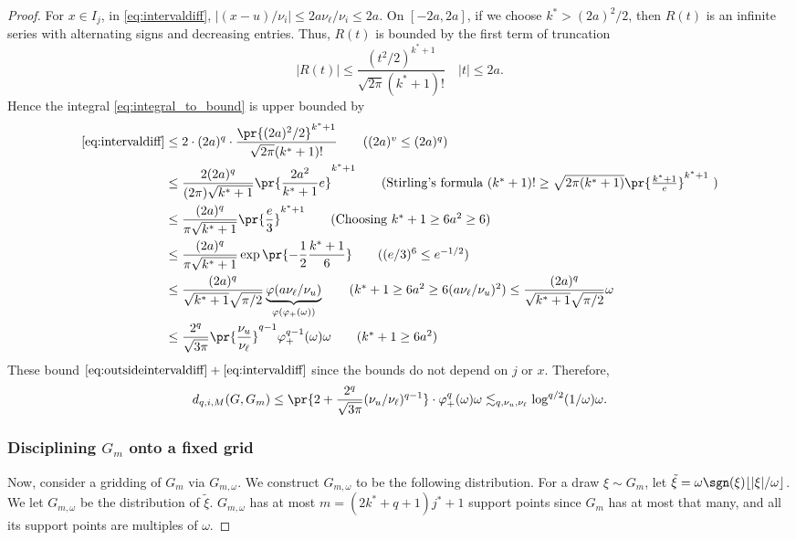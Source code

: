 \documentclass[12pt, reqno]{amsart}
\newcommand{\invphi}{\varphi_{+}}
\numberwithin{equation}{section}
\begin{document}
\begin{refsection}
\begin{appendices}
\begin{proof}
For $x \in I_j$, in \eqref{eq:intervaldiff}, $|(x-u)/\nu_i| \le 2a\nu_\ell / \nu_i \le
2a$. On $[-2a, 2a]$, if we choose $k^* > (2a)^2/2$, then $R(t)$ is an infinite series with
alternating signs and decreasing entries. Thus, $R(t)$
is bounded by the first term of truncation\[
|R(t)| \le \frac{(t^2/2)^{k^* + 1}}{\sqrt{2\pi} (k^* + 1)!} \quad |t| \le 2a. 
\]
Hence the integral
\eqref{eq:integral_to_bound} is upper bounded by \begin{align*}
\eqref{eq:intervaldiff} &
\le 2 \cdot (2a)^q \cdot \frac{ \pr{(2a)^2/2}^{k^*+1}}{
\sqrt{2\pi} (k^*+1)!} \tag{$(2a)^v \le (2a)^q$} \\
&\le
\frac{2(2a)^q}{(2\pi) \sqrt{k^*+1}}\pr{\frac{2a^2}{k^*+1} e}^{k^*+1}  \tag{Stirling's formula $
(k^*+1)! \ge \sqrt{2\pi( k^*+1)} \pr{\frac{k^*+1}{e}}^{k^*+1}
$
} \\&
\le \frac{(2a)^q}{
\pi \sqrt{k^*+1}}\pr{\frac{e}{3}}^{k^*+1} \tag{Choosing $k^*+1 \ge 6a^2 \ge 6$}
\\
& \le \frac{(2a)^q}{
\pi \sqrt{k^*+1}} \exp\pr{-\frac{1}{2} \frac{k^*+1}{6}} \tag{$(e/3)^6 \le
e^{-1/2}$} \\
& \le \frac{(2a)^q}{\sqrt{k^*+1} \sqrt{\pi/2}} \underbrace{\varphi(a\nu_\ell/\nu_u) }_
{\varphi(\varphi_+(\omega))}
\tag{$k^*+1 \ge
6a^2 \ge 6(a\nu_\ell/\nu_u)^2$} \le \frac{(2a)^q}{\sqrt{k^* + 1} \sqrt{\pi/2}} \omega \\
&\le \frac{2^q}{\sqrt{3\pi}}\pr{\frac{\nu_u}{\nu_\ell}}^{q-1} \invphi^{q-1}(\omega) \omega
\tag{$k^* + 1 \ge 6a^2$}
\end{align*}
These bound $\eqref{eq:outsideintervaldiff} + \eqref{eq:intervaldiff}$ since the bounds
do not depend on $j$ or $x$. Therefore, \[ d_{q,i,M}(G,G_m) \le \pr {2 + \frac{2^q}{
\sqrt{3\pi}} (\nu_u/\nu_\ell)^{q-1}} \cdot \invphi^q
 (\omega) \omega \lesssim_{q, \nu_u, \nu_\ell} \log^{q/2}(1/\omega)
\omega.
\]



\subsubsection{Disciplining $G_m$ onto a fixed grid}
Now, consider a gridding of $G_m$ via $G_{m,\omega}$. We construct $G_{m, \omega}$ to be the
following distribution. For a draw $\xi \sim G_m$, let $\tilde \xi = \omega \sgn
(\xi)\lfloor |\xi|/\omega\rfloor$. We let $G_{m,\omega}$ be the distribution of $\tilde
\xi$.  $G_{m,\omega}$ has at most $m = (2k^* + q + 1) j^* + 1$ support points since $G_m$
has at most that many, and all its support points are multiples of $\omega$.


\end{proof}
\end{appendices}
\end{refsection}
\end{document}
